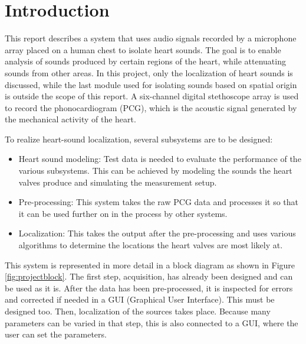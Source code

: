 \chapter{Introduction}


This report describes a system that uses audio signals recorded by a microphone array placed on a human chest to isolate heart sounds. The goal is to enable analysis of sounds produced by certain regions of the heart, while attenuating sounds from other areas. In this project, only the localization of heart sounds is discussed, while the last module used for isolating sounds based on spatial origin is outside the scope of this report. A six-channel digital stethoscope array is used to record the phonocardiogram (PCG), which is the acoustic signal generated by the mechanical activity of the heart.

To realize heart-sound localization, several subsystems are to be designed:
\begin{itemize}
    \item Heart sound modeling: Test data is needed to evaluate the performance of the various subsystems. This can be achieved by modeling the sounds the heart valves produce and simulating the measurement setup.
    \item Pre-processing: This system takes the raw PCG data and processes it so that it can be used further on in the process by other systems.
    \item Localization: This takes the output after the pre-processing and uses various algorithms to determine the locations the heart valves are most likely at. 
\end{itemize}

This system is represented in more detail in a block diagram as shown in Figure \ref{fig:projectblock}. The first step, acquisition, has already been designed and can be used as it is. After the data has been pre-processed, it is inspected for errors and corrected if needed in a GUI (Graphical User Interface). This must be designed too. Then, localization of the sources takes place. Because many parameters can be varied in that step, this is also connected to a GUI, where the user can set the parameters. 


